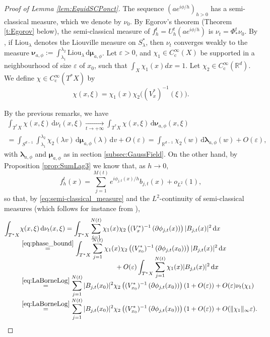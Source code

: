 \documentclass[JEP,XML,SOM,Unicode,published]{cedram}
\newcommand{\rc}{\mathrm{c}}
\newcommand{\rd}{\,\mathrm{d}}
\theoremstyle{plain}
\theoremstyle{definition}
\newcommand{\R}{\mathbb{R}}
\let\eps\varepsilon
\begin{document}
\begin{proof}[Proof of Lemma \ref{lem:EquidSCPonct}]
The sequence $(a e^{i\phi/h})_{h>0}$ has a semi-classical measure, which we denote by $\nu_0$. By Egorov's theorem (Theorem \ref{t:Egorov} below), the semi-classical measure of $f_h^t=U_h^t (a e^{i\phi/h})$ is $\nu_t = \Phi^t_* \nu_0$. By \cite[Th.\,1]{Schu}, if $\mathrm{Liou}_\lambda$ denotes the Liouville measure on $S_\lambda^*$, then $\nu_t$ converges weakly to the measure $ \boldsymbol{\nu}_{a,\phi}:=\int_{\lambda_1}^{\lambda_2}\mathrm{Liou}_\lambda \rd \boldsymbol{\mu}_{a,\phi}$. Let $\varepsilon>0$, and $\chi_1 \in C_\rc^\infty(X)$ be supported in a neighbourhood of size $\varepsilon$ of $x_0$, such that $\int_X\chi_1(x)dx=1$. Let $\chi_2\in C_\rc^\infty(\R^d)$. We define $\chi\in C_\rc^\infty(T^*X)$ by\vspace*{-3pt}
\[
\chi(x,\xi) = \chi_1(x) \chi_2 \bigl((V^*_x)^{-1}(\xi) \bigr).
\]

By the previous remarks, we have\vspace*{-5pt}
\begin{multline*}
\int_{T^*X} \chi(x,\xi) \rd \nu_t(x,\xi) \underset{t\to +\infty}{\to} \int_{T^*X} \chi(x,\xi)\rd \boldsymbol{\nu}_{a,\phi}(x,\xi)\\[-3pt]
= \int_{S^{d-1}} \int_{\lambda_1}^{\lambda_2} \chi_2(\lambda v) \rd \boldsymbol{\mu}_{a,\phi}(\lambda) \rd v + O(\varepsilon)= \int_{\mathbb{R}^{d-1}} \chi_2(w) \rd \boldsymbol{\lambda}_{a,\phi}(w) + O(\varepsilon),
\end{multline*}
with $\boldsymbol{\lambda}_{a,\phi}$ and $\boldsymbol{\mu}_{a,\phi}$ as in section \ref{subsec:GaussField}. On the other hand, by Proposition \ref{prop:SumLag3} we know that, as $h\to 0$,\vspace*{-5pt}
\[f_h^t (x) = \sum_{j=1}^{M(t)} e^{i\phi_{j, t}(x)/h} b_{j, t}(x) + o_{L^2}(1),
\]
so that, by \eqref{eq:semi-classical_measure} and the $L^2$-continuity of semi-classical measures (which follows for instance from \cite[Th.\,5.1]{Zworski_2012}),\vspace*{-3pt}
\begin{align*}
\int_{T^*X} &\chi(x,\xi)\rd \nu_t(x,\xi) = \int_{T^*X} \sum_{j=1}^{N(t)} \chi_1(x)\chi_2\left((V_x^*)^{-1}\left(\partial \phi_{j,t}(x)\right)\right) |B_{j,t}(x)|^2 \rd x\\[-8pt]
&\overset{\eqref{eq:phase_bound}}{=}\int_{T^*X} \sum_{j=1}^{N(t)} \chi_1(x)\chi_2\left((V_{x_0}^*)^{-1}\left(\partial \phi_{j,t}(x_0)\right)\right) |B_{j,t}(x)|^2 \rd x\\[-10pt]
&\hspace*{5cm}+O(\eps)\int_{T^*X} \sum_{j=1}^{N(t)} \chi_1(x)|B_{j,t}(x)|^2 \rd x\\[-10pt]
&\overset{\eqref{eq:LaBorneLog}}{=}\sum_{j=1}^{N(t)} |B_{j,t}(x_0)|^2 \chi_2\left((V_{x_0}^*)^{-1}\left(\partial \phi_{j,t}(x_0)\right)\right) (1+O(\eps))+O(\eps)\nu_t(\chi_1)\\[-3pt]
&\overset{\eqref{eq:LaBorneLog}}{=}\sum_{j=1}^{N(t)} |B_{j,t}(x_0)|^2 \chi_2\left((V_{x_0}^*)^{-1}\left(\partial \phi_{j,t}(x_0)\right)\right) (1+O(\eps))+O(\|\chi_1\|_\infty\eps).
\end{align*}


\end{proof}
\end{document}
